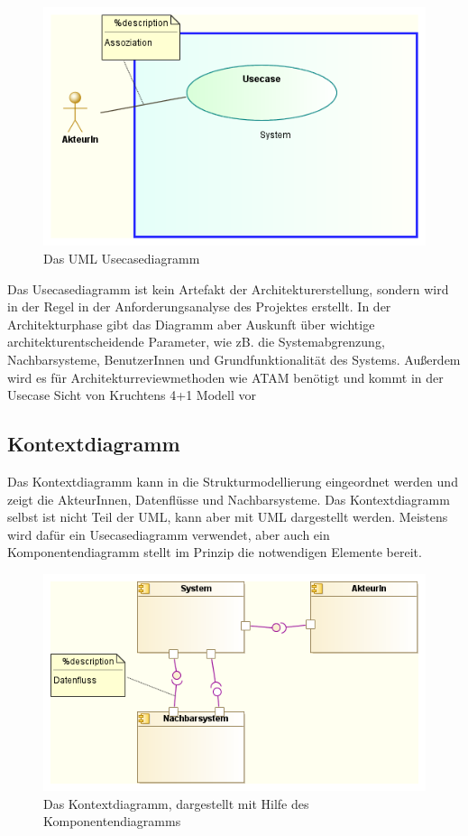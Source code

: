 \begin{figure}[H]
    \centering
    \includegraphics[scale=0.8]{uml/modelling/usecase.png}
    \caption{Das UML Usecasediagramm}
    \label{fig:umlusecasemodel}
\end{figure}

Das Usecasediagramm ist kein Artefakt der Architekturerstellung, sondern wird in der Regel in der Anforderungsanalyse des Projektes erstellt. In der Architekturphase gibt das Diagramm aber Auskunft über wichtige architekturentscheidende Parameter, wie zB. die Systemabgrenzung, Nachbarsysteme, BenutzerInnen und Grundfunktionalität des Systems. Außerdem wird es für Architekturreviewmethoden wie ATAM benötigt und kommt in der Usecase Sicht von Kruchtens 4+1 Modell vor \cite[S. 148]{basiswissen}

\subsection{Kontextdiagramm}
Das Kontextdiagramm kann in die Strukturmodellierung eingeordnet werden und zeigt die AkteurInnen, Datenflüsse und Nachbarsysteme. Das Kontextdiagramm selbst ist nicht Teil der UML, kann aber mit UML dargestellt werden. Meistens wird dafür ein Usecasediagramm verwendet, aber auch ein Komponentendiagramm stellt im Prinzip die notwendigen Elemente bereit. \cite[S. 255]{glasklar}

\begin{figure}[H]
    \centering
    \includegraphics[scale=0.8]{uml/modelling/context.png}
    \caption{Das Kontextdiagramm, dargestellt mit Hilfe des Komponentendiagramms}
    \label{fig:umlcontextmodel}
\end{figure}

